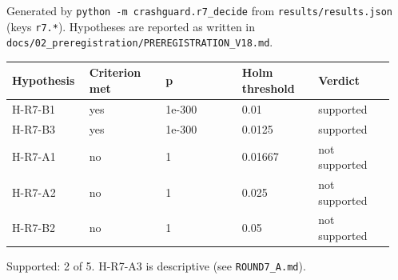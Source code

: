 


Generated by \texttt{python -m crashguard.r7\_decide} from \texttt{results/results.json} (keys \texttt{r7.*}). Hypotheses are reported as written in \texttt{docs/02\_preregistration/PREREGISTRATION\_V18.md}.

{\scriptsize\raggedright
\begin{longtable}{p{0.190\linewidth}p{0.190\linewidth}p{0.190\linewidth}p{0.190\linewidth}p{0.190\linewidth}}
\toprule
Hypothesis & Criterion met & p & Holm threshold & Verdict \\
\midrule
\endhead
H-R7-B1 & yes & 1e-300 & 0.01 & supported \\
H-R7-B3 & yes & 1e-300 & 0.0125 & supported \\
H-R7-A1 & no & 1 & 0.01667 & not supported \\
H-R7-A2 & no & 1 & 0.025 & not supported \\
H-R7-B2 & no & 1 & 0.05 & not supported \\
\bottomrule
\end{longtable}}

Supported: 2 of 5. H-R7-A3 is descriptive (see \texttt{ROUND7\_A.md}).

